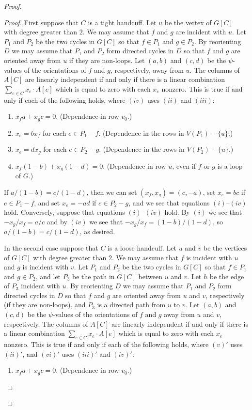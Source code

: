 \documentclass[12pt]{article}
\theoremstyle{definition}
\begin{document}
\begin{proof}
\begin{proof}
First suppose that $C$ is a tight handcuff.
Let $u$ be the vertex of $G[C]$ with degree greater than $2$.
We may assume that $f$ and $g$ are incident with $u$.
Let $P_1$ and $P_2$ be the two cycles in $G[C]$ so that $f \in P_1$ and $g \in P_2$.
By reorienting $D$ we may assume that $P_1$ and $P_2$ form directed cycles in $D$ so that $f$ and $g$ are oriented away from $u$ if they are non-loops.
Let $(a,b)$ and $(c,d)$ be the $\psi$-values of the orientations of $f$ and $g$, respectively, away from $u$.
The columns of $A[C]$ are linearly independent if and only if there is a linear combination $\sum_{e \in C} x_e  \cdot A[e]$ which is equal to zero with each $x_e$ nonzero.
This is true if and only if each of the following holds, where $(iv)$ uses $(ii)$ and $(iii)$:
\begin{enumerate}[label=$(\roman*)$]
    \item $x_fa + x_gc = 0$. (Dependence in row $v_0$.)

    \item $x_e = bx_f$ for each $e \in P_1 - f$. (Dependence in the rows in $V(P_1) - \{u\}$.)

    \item $x_e = dx_g$ for each $e \in P_2 - g$. (Dependence in the rows in $V(P_2) - \{u\}$.)

     \item $x_f(1 - b) + x_g(1 - d) = 0$. (Dependence in row $u$, even if $f$ or $g$ is a loop of $G$.)
\end{enumerate}
If $a/(1-b) = c/(1-d)$, then we can set $(x_f, x_g) = (c, -a)$, set $x_e = bc$ if $e \in P_1 - f$, and set $x_e = -ad$ if $e \in P_2 - g$, and we see that equations $(i)$--$(iv)$ hold.
Conversely, suppose that equations $(i)$--$(iv)$ hold.
By $(i)$ we see that $-x_g/x_f = a/c$ and by $(iv)$ we see that $-x_g/x_f = (1 - b)/(1 - d)$, so $a/(1-b) = c/(1 - d)$, as desired.



In the second case suppose that $C$ is a loose handcuff.
Let $u$ and $v$ be the vertices of $G[C]$ with degree greater than $2$.
We may assume that $f$ is incident with $u$ and $g$ is incident with $v$.
Let $P_1$ and $P_2$ be the two cycles in $G[C]$ so that $f \in P_1$ and $g \in P_2$, and let $P_3$ be the path in $G[C]$ between $u$ and $v$.
Let $h$ be the edge of $P_3$ incident with $u$.
By reorienting $D$ we may assume that $P_1$ and $P_2$ form directed cycles in $D$ so that $f$ and $g$ are oriented away from $u$ and $v$, respectively (if they are non-loops), and $P_3$ is a directed path from $u$ to $v$.
Let $(a,b)$ and $(c,d)$ be the $\psi$-values of the orientations of $f$ and $g$ away from $u$ and $v$, respectively.
The columns of $A[C]$ are linearly independent if and only if there is a linear combination $\sum_{e \in C} x_e  \cdot A[e]$ which is equal to zero with each $x_e$ nonzero.
This is true if and only if each of the following holds, where $(v)'$ uses $(ii)'$, and $(vi)'$ uses $(iii)'$ and $(iv)'$:
\begin{enumerate}[label=$(\roman*)'$]
    \item $x_fa + x_gc = 0$. (Dependence in row $v_0$.)


\end{enumerate}
\end{proof}
\end{proof}
\end{document}
